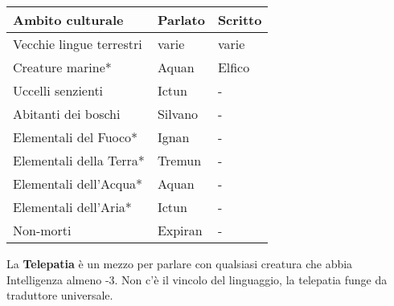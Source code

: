 \begin{multicols}{2}
{\noindent\begin{tabularx}{\linewidth}{lXX}
		\toprule
\textbf{Ambito culturale}& \textbf{Parlato} & \textbf{Scritto}\\
\toprule
Vecchie lingue terrestri& varie & varie\\
Creature marine* & Aquan& Elfico\\
Uccelli senzienti& Ictun & -\\
Abitanti dei boschi& Silvano& - \\
Elementali del Fuoco* & Ignan&-\\
Elementali della Terra*& Tremun &-\\
Elementali dell'Acqua* & Aquan & - \\
Elementali dell'Aria*& Ictun &-\\
Non-morti & Expiran & - \\
\end{tabularx}}

\medskip

La \textbf{Telepatia} è un mezzo per parlare con qualsiasi creatura che abbia Intelligenza almeno -3. Non c'è il vincolo del linguaggio, la telepatia funge da traduttore universale.

%


\end{multicols}

\pagebreak

